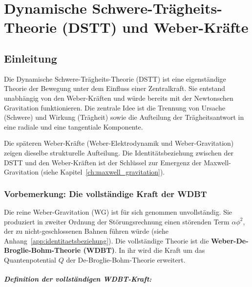 
\chapter{Dynamische Schwere-Trägheits-Theorie (DSTT) und Weber-Kräfte}
\label{ch:dstt_weber_kraefte}

\section{Einleitung}
\label{sec:dstt_einleitung}

Die Dynamische Schwere-Trägheits-Theorie (DSTT) ist eine eigenständige Theorie der Bewegung unter dem Einfluss einer Zentralkraft. Sie entstand unabhängig von den Weber-Kräften und würde bereits mit der Newtonschen Gravitation funktionieren. Die zentrale Idee ist die Trennung von Ursache (Schwere) und Wirkung (Trägheit) sowie die Aufteilung der Trägheitsantwort in eine radiale und eine tangentiale Komponente.

Die späteren Weber-Kräfte (Weber-Elektrodynamik und Weber-Gravitation) zeigen dieselbe strukturelle Aufteilung. Die Identitätsbeziehung zwischen der DSTT und den Weber-Kräften ist der Schlüssel zur Emergenz der Maxwell-Gravitation (siehe Kapitel~\ref{ch:maxwell_gravitation}).

\subsection{Vorbemerkung: Die vollständige Kraft der WDBT}
\label{sub:wdbt_kraft_vollstaendig}

Die reine Weber-Gravitation (WG) ist für sich genommen unvollständig. Sie produziert in zweiter Ordnung der Störungsrechnung einen störenden Term \(\alpha\phi^2\), der zu nicht-geschlossenen Bahnen führen würde (siehe Anhang~\ref{app:identitaetsbeziehung}). Die vollständige Theorie ist die \textbf{Weber-De-Broglie-Bohm-Theorie (WDBT)}. In ihr wird die Kraft um das Quantenpotential \(Q\) der De-Broglie-Bohm-Theorie erweitert.

\paragraph{Definition der vollständigen WDBT-Kraft:}

